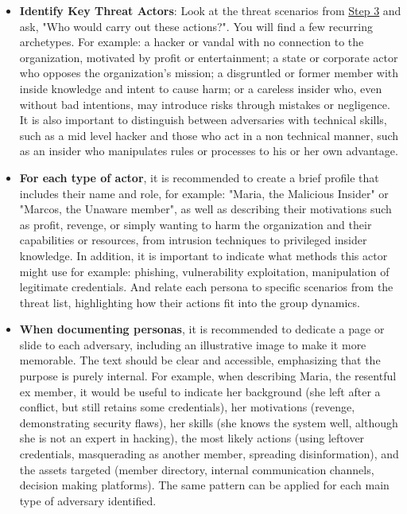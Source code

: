 \begin{itemize}
    \item \textbf{Identify Key Threat Actors}: Look at the threat scenarios from \hyperref[subsec:Step3]{Step 3}
    and ask, "Who would carry out these actions?". You will find a few recurring archetypes. For example:
    a hacker or vandal with no connection to the organization, motivated by profit or
    entertainment; a state or corporate actor who opposes the organization's
    mission; a disgruntled or former member with inside knowledge and intent to
    cause harm; or a careless insider who, even without bad intentions, may
    introduce risks through mistakes or negligence. It is also important to
    distinguish between adversaries with technical skills, such as a mid level
    hacker and those who act in a non technical manner, such as an insider who
    manipulates rules or processes to his or her own advantage.

    \item \textbf{For each type of actor}, it is recommended to create a brief profile that
    includes their name and role, for example: "Maria, the Malicious Insider" or "Marcos,
    the Unaware member", as well as describing their motivations such as profit,
    revenge, or simply wanting to harm the organization and their capabilities or
    resources, from intrusion techniques to privileged insider knowledge. In
    addition, it is important to indicate what methods this actor might use for example:
    phishing, vulnerability exploitation, manipulation of legitimate credentials.
    And relate each persona to specific scenarios from the threat list, highlighting
    how their actions fit into the group dynamics.

    \item \textbf{When documenting personas}, it is recommended to dedicate a page or slide to each
    adversary, including an illustrative image to make it more memorable. The text should be clear
    and accessible, emphasizing that the purpose is purely internal. For example, when
    describing Maria, the resentful ex member, it would be useful to indicate her
    background (she left after a conflict, but still retains some credentials), her
    motivations (revenge, demonstrating security flaws), her skills (she knows the
    system well, although she is not an expert in hacking), the most likely actions
    (using leftover credentials, masquerading as another member, spreading
    disinformation), and the assets targeted (member directory, internal
    communication channels, decision making platforms). The same pattern can be
    applied for each main type of adversary identified.
    

\end{itemize}
